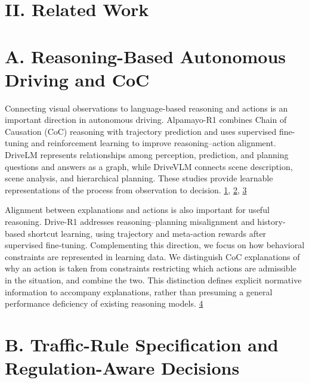 \documentclass[11pt,a4paper]{article}
\begin{document}
\section*{II. Related Work}


\section*{A. Reasoning-Based Autonomous Driving and CoC}

Connecting visual observations to language-based reasoning and actions is an important direction in autonomous driving. Alpamayo-R1 combines Chain of Causation (CoC) reasoning with trajectory prediction and uses supervised fine-tuning and reinforcement learning to improve reasoning–action alignment. DriveLM represents relationships among perception, prediction, and planning questions and answers as a graph, while DriveVLM connects scene description, scene analysis, and hierarchical planning. These studies provide learnable representations of the process from observation to decision. \href{\detokenize{https://arxiv.org/abs/2511.00088}}{1}, \href{\detokenize{https://arxiv.org/abs/2312.14150}}{2}, \href{\detokenize{https://arxiv.org/abs/2402.12289}}{3}\par

Alignment between explanations and actions is also important for useful reasoning. Drive-R1 addresses reasoning–planning misalignment and history-based shortcut learning, using trajectory and meta-action rewards after supervised fine-tuning. Complementing this direction, we focus on how behavioral constraints are represented in learning data. We distinguish CoC explanations of why an action is taken from constraints restricting which actions are admissible in the situation, and combine the two. This distinction defines explicit normative information to accompany explanations, rather than presuming a general performance deficiency of existing reasoning models. \href{\detokenize{https://ojs.aaai.org/index.php/AAAI/article/view/37602}}{4}\par

\section*{B. Traffic-Rule Specification and Regulation-Aware Decisions}
\end{document}
